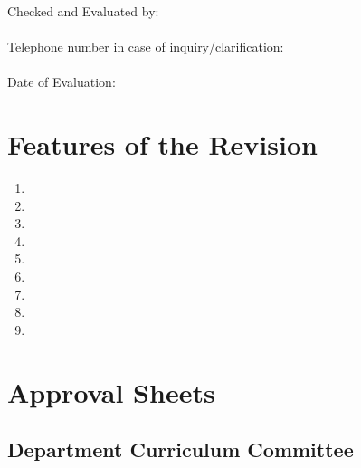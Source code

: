 \documentclass[11pt,a4paper]{article}
\begin{document}

\begin{tabbing}
Checked and Evaluated by: \hspace{4cm}\= \underline{\hspace{3in}}\\
\\
Telephone  number in case of inquiry/clarification: \> \underline{\hspace{3in}}\\
\\
Date of Evaluation: \> \underline{\hspace{3in}}
\end{tabbing}



\newpage

\tableofcontents

\newpage
\pagestyle{plain}

\section{Features of the Revision}


\begin{enumerate}
\item {}
\item {}
\item {}
\item {}
\item {}
\item {}
\item {}
\item {}
\item {}
\end{enumerate}

\newpage
\thispagestyle{empty}
\section{Approval Sheets}

\subsection*{Department Curriculum Committee}
\end{document}
